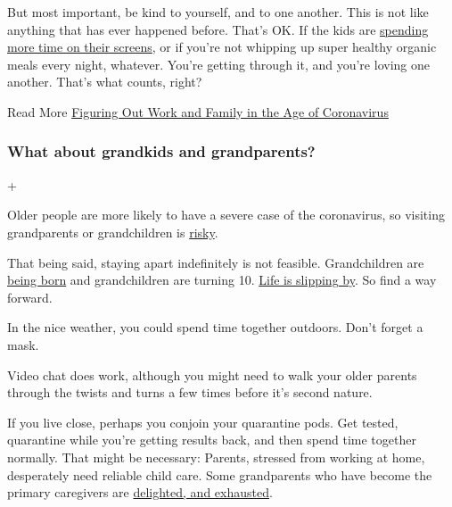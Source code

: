 But most important, be kind to yourself, and to one another. This is not
like anything that has ever happened before. That's OK. If the kids are
\href{https://www.nytimes3xbfgragh.onion/2020/04/13/parenting/manage-screen-time-coronavirus.html}{spending
more time on their screens}, or if you're not whipping up super healthy
organic meals every night, whatever. You're getting through it, and
you're loving one another. That's what counts, right?

 Read More
\href{https://www.nytimes3xbfgragh.onion/2020/03/19/us/work-from-home-mothers-coronavirus-covid19.html}{Figuring
Out Work and Family in the Age of Coronavirus}

\hypertarget{what-about-grandkids-and-grandparents}{%
\subsubsection{What about grandkids and
grandparents?}\label{what-about-grandkids-and-grandparents}}

+

Older people are more likely to have a severe case of the coronavirus,
so visiting grandparents or grandchildren is
\href{https://www.nytimes3xbfgragh.onion/2020/03/20/parenting/grandparents-visit-safety-coronavirus.html}{risky}.

That being said, staying apart indefinitely is not feasible.
Grandchildren are
\href{https://www.nytimes3xbfgragh.onion/2020/06/16/parenting/baby/grandparents-meet-newborn-coronavirus.html}{being
born} and grandchildren are turning 10.
\href{https://www.nytimes3xbfgragh.onion/2020/04/29/well/family/coronavirus-grandchildren-compromised-immunity-cancer.html}{Life
is slipping by}. So find a way forward.

In the nice weather, you could spend time together outdoors. Don't
forget a mask.

Video chat does work, although you might need to walk your older parents
through the twists and turns a few times before it's second nature.

If you live close, perhaps you conjoin your quarantine pods. Get tested,
quarantine while you're getting results back, and then spend time
together normally. That might be necessary: Parents, stressed from
working at home, desperately need reliable child care. Some grandparents
who have become the primary caregivers are
\href{https://www.nytimes3xbfgragh.onion/2020/05/12/parenting/coronavirus-grandparents-childcare.html?type=roundup\&link=intro}{delighted,
and exhausted}.

